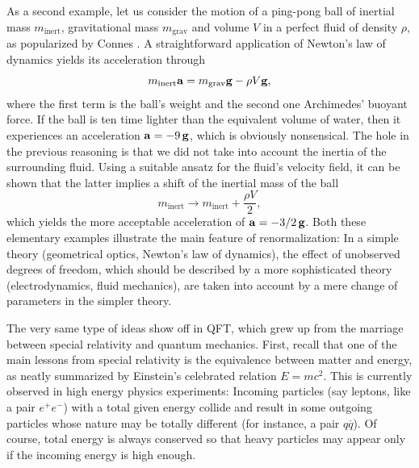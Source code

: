 \documentclass[12pt,here,feynmf]{article}
\begin{document}
As a second example, let us consider the motion of a ping-pong ball of inertial mass $m_{\mathrm{inert}}$, gravitational mass $m_{\mathrm{grav}}$ and volume $V$ in a perfect fluid of density $\rho$, as popularized by Connes \cite{connesmarcolli}. A straightforward application of Newton's law of dynamics yields its acceleration through 
\begin{equation} 
m_{\mathrm{inert}}{\bf a}=m_{\mathrm{grav}}{\bf g}-\rho V{\bf g},
\end{equation}
where the first term is the ball's weight and the second one Archimedes' buoyant force. If the ball is ten time lighter than the equivalent volume of water, then it experiences an acceleration ${\bf a}=-9\,{\bf g}$, which is obviously nonsensical. The hole in the previous reasoning is that we did not take into account the inertia of the surrounding fluid. Using a suitable ansatz for the fluid's velocity field, it can be shown \cite{connesmarcolli} that the latter implies a shift of the inertial mass of the ball 
\begin{equation}
m_{\mathrm{inert}}\rightarrow m_{\mathrm{inert}}+\frac{\rho V}{2},
\end{equation}
which yields the more acceptable acceleration of ${\bf a}=-3/2\,{\bf g}$.  Both these elementary examples illustrate the main feature of renormalization: In a simple theory (geometrical optics, Newton's law of dynamics), the effect of unobserved degrees of freedom, which should be described by a more sophisticated theory (electrodynamics, fluid mechanics), are taken into account by a mere change of parameters in the simpler theory.  

 
The very same type of ideas show off in QFT, which grew up from the marriage between special relativity and quantum mechanics. First, recall that one of the main lessons from special relativity is the equivalence between matter and energy, as neatly summarized by Einstein's celebrated relation $E=mc^{2}$. This is currently observed in high energy physics experiments: Incoming particles (say leptons, like a pair $e^{+}e^{-}$) with a total given energy collide and result in some outgoing particles whose nature may be totally different (for instance, a pair $q\overline{q}$).  Of course, total energy is always conserved so that heavy particles may appear only if the incoming energy is high enough.
     
\end{document}
